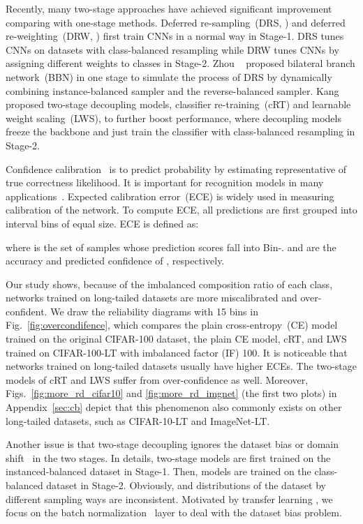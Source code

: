 \documentclass[final]{cvpr}
\begin{document}
	
	Recently, many two-stage approaches have achieved significant improvement comparing with one-stage methods. Deferred re-sampling~(DRS, \cite{ldam}) and deferred re-weighting~(DRW, \cite{ldam}) first train CNNs in a normal way in Stage-1. DRS tunes CNNs on datasets with class-balanced resampling while DRW tunes CNNs by assigning different weights to classes in Stage-2. Zhou \etal~\cite{bbn} proposed bilateral branch network~(BBN) in one stage to simulate the process of DRS by dynamically combining instance-balanced sampler and the reverse-balanced sampler. Kang \etal~\cite{decouple} proposed two-stage decoupling models, classifier re-training~(cRT) and learnable weight scaling~(LWS), to further boost performance, where decoupling models freeze the backbone and just train the classifier with class-balanced resampling in Stage-2.
	
	
	Confidence calibration~\cite{niculescu2005predicting, calibration} is to predict probability by estimating representative of true correctness likelihood. It is important for recognition models in many applications~\cite{bojarski2016end, jiang2012calibrating}. Expected calibration error~(ECE) is widely used in measuring calibration of the network. To compute ECE, all  predictions are first grouped into  interval bins of equal size. ECE is defined as:
	
	where  is the set of samples whose prediction scores fall into Bin-.  and  are the accuracy and predicted confidence of , respectively.
	
	Our study shows, because of the imbalanced composition ratio of each class, networks trained on long-tailed datasets are more miscalibrated and over-confident. We draw the reliability diagrams with 15 bins in Fig.~\ref{fig:overcondifence}, which compares the plain cross-entropy~(CE) model trained on the original CIFAR-100 dataset, the plain CE model, cRT, and LWS trained on CIFAR-100-LT with imbalanced factor (IF) 100. It is noticeable that networks trained on long-tailed datasets usually have higher ECEs. The two-stage models of cRT and LWS suffer from over-confidence as well. Moreover, Figs.~\ref{fig:more_rd_cifar10} and \ref{fig:more_rd_imgnet} (the first two plots) in Appendix~\ref{sec:cb} depict that this phenomenon also commonly exists on other long-tailed datasets, such as CIFAR-10-LT and ImageNet-LT.
	


	Another issue is that two-stage decoupling ignores the dataset bias or domain shift~\cite{quionero2009dataset} in the two stages. In details, two-stage models are first trained on the instanced-balanced dataset  in Stage-1. Then, models are trained on the class-balanced dataset  in Stage-2. Obviously,  and distributions of the dataset by different sampling ways are inconsistent. Motivated by transfer learning \cite{li2018adaptive, wang2019transferable}, we focus on the batch normalization~\cite{bn} layer to deal with the dataset bias problem.
	
\end{document}
